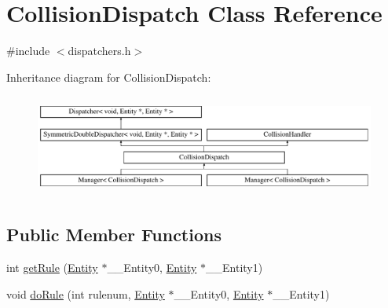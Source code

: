 \hypertarget{class_collision_dispatch}{\section{Collision\-Dispatch Class Reference}
\label{class_collision_dispatch}
}


{\ttfamily \#include $<$dispatchers.\-h$>$}

Inheritance diagram for Collision\-Dispatch\-:\begin{figure}[H]
\begin{center}
\leavevmode
\includegraphics[height=3.383686cm]{class_collision_dispatch}
\end{center}
\end{figure}
\subsection*{Public Member Functions}
\begin{DoxyCompactItemize}
\item 
int \hyperlink{class_collision_dispatch_a11a6867a50874c73098d0744ca3f8bfe}{get\-Rule} (\hyperlink{class_entity}{Entity} $\ast$\-\_\-\-\_\-\-Entity0, \hyperlink{class_entity}{Entity} $\ast$\-\_\-\-\_\-\-Entity1)
\item 
void \hyperlink{class_collision_dispatch_a058bd125ab9bce3aaf054c6cf07381cf}{do\-Rule} (int rulenum, \hyperlink{class_entity}{Entity} $\ast$\-\_\-\-\_\-\-Entity0, \hyperlink{class_entity}{Entity} $\ast$\-\_\-\-\_\-\-Entity1)
\end{DoxyCompactItemize}


